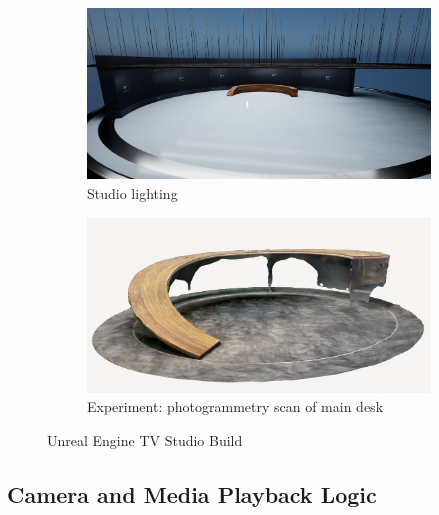 \documentclass[
  a4paper,  %
  twoside,  %
  bibliography=totoc,
  headsepline,
  cleardoublepage=empty,
  parskip=half,
  draft=false
]{scrbook}
\begin{document}
\begin{figure}[h]
  \begin{subfigure}{0.45\textwidth}
    \includegraphics[width=\linewidth]{graphics/images/unreal-engine/studio/studio-totale.png}
    \caption{Studio lighting}
  \end{subfigure}
  \begin{subfigure}{0.45\textwidth}
    \includegraphics[width=\linewidth]{graphics/images/unreal-engine/studio/Photogrammetry-Desk.png}
    \caption{Experiment: photogrammetry scan of main desk}
    \label{fig:photogrammetry-desk}
  \end{subfigure}

  \caption{Unreal Engine TV Studio Build}
  \label{fig:ue-studio-build}
\end{figure}

\subsection*{Camera and Media Playback Logic} 
\end{document}

